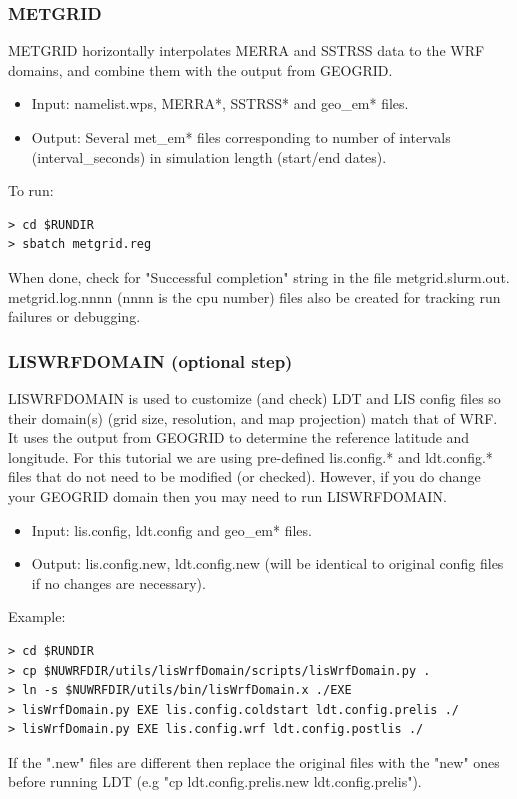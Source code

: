 \begin{frame}[fragile]\frametitle{METGRID}

\footnotesize{
METGRID horizontally interpolates MERRA and SSTRSS data to the WRF domains, and combine them with the
output from GEOGRID.
\begin{itemize}
\item Input: namelist.wps, MERRA*, SSTRSS* and geo\_em* files.
\item Output: Several met\_em* files corresponding to number of intervals (interval\_seconds) in simulation length (start/end dates).
\end{itemize}
}    
\hrulefill\par
\footnotesize{To run:}
\begin{lstlisting}
> cd $RUNDIR
> sbatch metgrid.reg
\end{lstlisting}
When done, check for  "Successful completion" string in the file metgrid.slurm.out. metgrid.log.nnnn (nnnn is the cpu number) files also be created for tracking run failures or debugging.


\end{frame}

\begin{frame}[fragile]\frametitle{LISWRFDOMAIN (optional step)}

\footnotesize{
LISWRFDOMAIN is used to customize (and check) LDT and LIS config files so their domain(s) (grid size, resolution, and map projection) match that of WRF. It uses the output from GEOGRID  to determine the reference latitude and longitude. For this tutorial we are using pre-defined lis.config.* and ldt.config.* files that do not need to be modified (or checked). However, if you do change your GEOGRID domain  then you may need to run LISWRFDOMAIN.
\begin{itemize}
\item Input: lis.config, ldt.config and geo\_em* files.
\item Output: lis.config.new, ldt.config.new (will be identical to original config files if no changes are necessary).
\end{itemize}
}    
\hrulefill\par
\footnotesize{Example:}
\begin{lstlisting}
> cd $RUNDIR
> cp $NUWRFDIR/utils/lisWrfDomain/scripts/lisWrfDomain.py .
> ln -s $NUWRFDIR/utils/bin/lisWrfDomain.x ./EXE
> lisWrfDomain.py EXE lis.config.coldstart ldt.config.prelis ./
> lisWrfDomain.py EXE lis.config.wrf ldt.config.postlis ./
\end{lstlisting}
\scriptsize{
If the ".new" files are different then replace the original files with the "new" ones before running LDT (e.g "cp ldt.config.prelis.new ldt.config.prelis").}

\end{frame}

